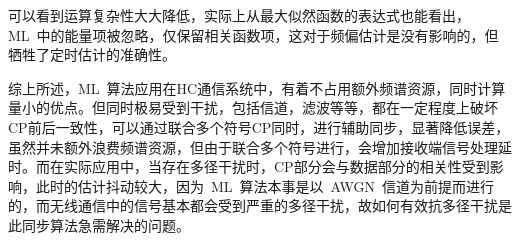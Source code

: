 可以看到运算复杂性大大降低，实际上从最大似然函数的表达式也能看出，ML~中的能量项被忽略，仅保留相关函数项，这对于频偏估计是没有影响的，但牺牲了定时估计的准确性。

综上所述，ML~算法应用在HC通信系统中，有着不占用额外频谱资源，同时计算量小的优点。但同时极易受到干扰，包括信道，滤波等等，都在一定程度上破坏CP前后一致性，可以通过联合多个符号CP同时，进行辅助同步，显著降低误差，虽然并未额外浪费频谱资源，但由于联合多个符号进行，会增加接收端信号处理延时。而在实际应用中，当存在多径干扰时，CP部分会与数据部分的相关性受到影响，此时的估计抖动较大，因为~ML~算法本事是以~AWGN~信道为前提而进行的，而无线通信中的信号基本都会受到严重的多径干扰，故如何有效抗多径干扰是此同步算法急需解决的问题。





